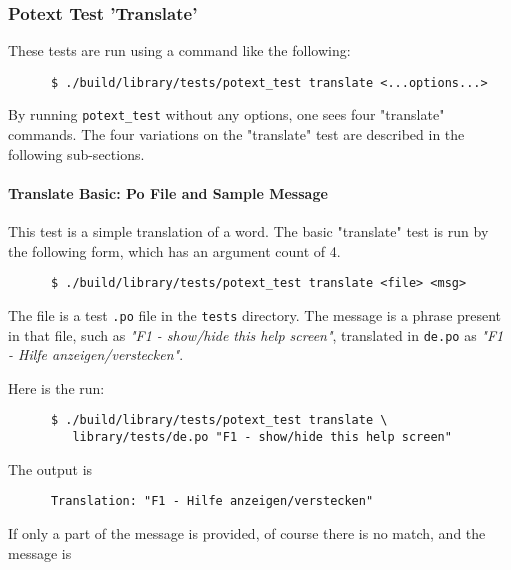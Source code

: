 \subsubsection{Potext Test 'Translate'}
\label{subsubsec:potext_test_translate}

   These tests are run using a command like the following:

   \begin{verbatim}
      $ ./build/library/tests/potext_test translate <...options...>
   \end{verbatim}

   By running \texttt{potext\_test} without any options, one sees
   four "translate" commands.
   The four variations on the "translate"
   test are described in the following sub-sections.

\paragraph{Translate Basic: Po File and Sample Message}
\label{paragraph:potext_test_translate_po_message}

   This test is a simple translation of a word.
   The basic "translate" test is run by the following form, which has an
   argument count of 4.

   \begin{verbatim}
      $ ./build/library/tests/potext_test translate <file> <msg>
   \end{verbatim}

   The file is a test \texttt{.po} file in the
   \texttt{tests} directory.
   The message is a phrase present in that file, such as
   \textsl{"F1 - show/hide this help screen"}, translated in
   \texttt{de.po} as
   \textsl{"F1 - Hilfe anzeigen/verstecken"}.

   Here is the run:

   \begin{verbatim}
      $ ./build/library/tests/potext_test translate \
         library/tests/de.po "F1 - show/hide this help screen"
   \end{verbatim}

   The output is

   \begin{verbatim}
      Translation: "F1 - Hilfe anzeigen/verstecken"
   \end{verbatim}

   If only a part of the message is provided, of course there is no
   match, and the message is

